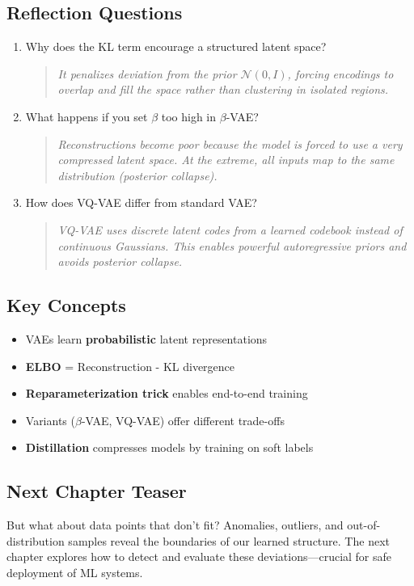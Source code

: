 \subsection{Reflection Questions}
\begin{enumerate}
    \item Why does the KL term encourage a structured latent space?
    \begin{quote}
        \textit{It penalizes deviation from the prior $\mathcal{N}(0,I)$, forcing encodings to overlap and fill the space rather than clustering in isolated regions.}
    \end{quote}

    \item What happens if you set $\beta$ too high in $\beta$-VAE?
    \begin{quote}
        \textit{Reconstructions become poor because the model is forced to use a very compressed latent space. At the extreme, all inputs map to the same distribution (posterior collapse).}
    \end{quote}

    \item How does VQ-VAE differ from standard VAE?
    \begin{quote}
        \textit{VQ-VAE uses discrete latent codes from a learned codebook instead of continuous Gaussians. This enables powerful autoregressive priors and avoids posterior collapse.}
    \end{quote}
\end{enumerate}

\subsection{Key Concepts}
\begin{itemize}
    \item VAEs learn \textbf{probabilistic} latent representations
    \item \textbf{ELBO} = Reconstruction - KL divergence
    \item \textbf{Reparameterization trick} enables end-to-end training
    \item Variants ($\beta$-VAE, VQ-VAE) offer different trade-offs
    \item \textbf{Distillation} compresses models by training on soft labels
\end{itemize}

\subsection{Next Chapter Teaser}
 But what about data points that don't fit? Anomalies, outliers, and out-of-distribution samples reveal the boundaries of our learned structure. The next chapter explores how to detect and evaluate these deviations---crucial for safe deployment of ML systems.
